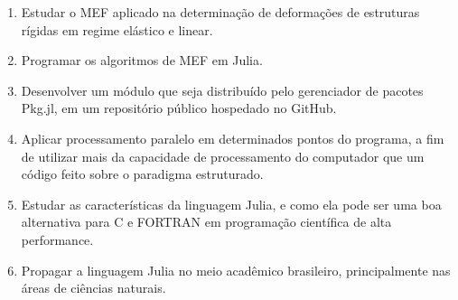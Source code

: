 \begin{enumerate}
    \item Estudar o MEF aplicado na determinação de deformações de estruturas rígidas em regime elástico e linear.
    \item Programar os algoritmos de MEF em Julia.
    \item Desenvolver um módulo que seja distribuído pelo gerenciador de pacotes Pkg.jl, em um repositório público hospedado no GitHub.
    \item Aplicar processamento paralelo em determinados pontos do programa, a fim de utilizar mais da capacidade de processamento do computador que um código feito sobre o paradigma estruturado.
    \item Estudar as características da linguagem Julia, e como ela pode ser uma boa alternativa para C e FORTRAN em programação científica de alta performance.
    \item Propagar a linguagem Julia no meio acadêmico brasileiro, principalmente nas áreas de ciências naturais.
\end{enumerate}

